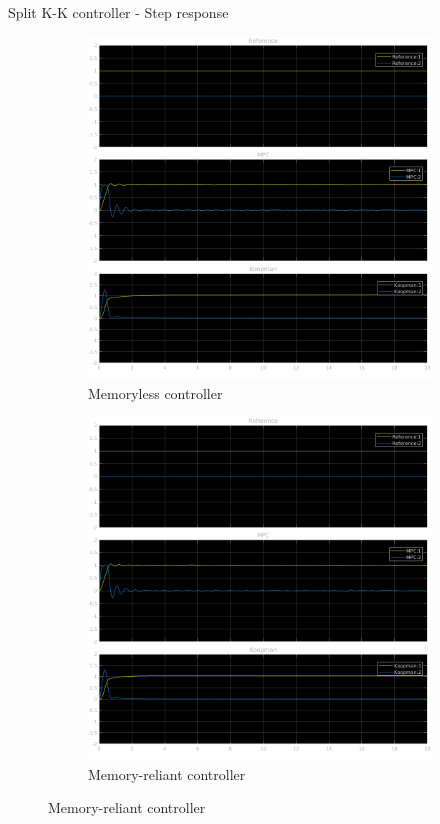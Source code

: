 \documentclass{beamer}
\begin{document}
\begin{frame}{Split K-K controller - Step response}
    \begin{figure}
        \centering
        \begin{subfigure}[b]{0.45\textwidth}
            \centering
            \includegraphics[width=\textwidth]{Undelayed_Split_Step.png}
            \caption{Memoryless controller}
        \end{subfigure}
        \hfill
        \begin{subfigure}[b]{0.45\textwidth}
            \centering
            \includegraphics[width=\textwidth]{Delayed_Split_Step.png}
            \caption{Memory-reliant controller}
        \end{subfigure}
    \end{figure}
\end{frame}
\end{document}
